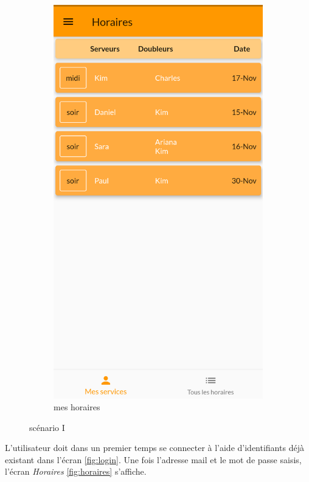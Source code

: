 \begin{figure}[!h]
\begin{subfigure}{.3\textwidth}
        \includegraphics[width=0.9\linewidth]{screenshots/scenario_01/mesHoraires.png}
        \caption{mes horaires}
        \label{fig:mesHoraires}
    \end{subfigure}
    \caption{scénario I}
    \label{fig:scen01}
\end{figure}

L'utilisateur doit dans un premier temps se connecter à l'aide d'identifiants déjà existant dans l'écran \ref{fig:login}. Une fois l'adresse mail et le mot de passe saisis, 
l'écran \textit{Horaires} \ref{fig:horaires} s'affiche. 


